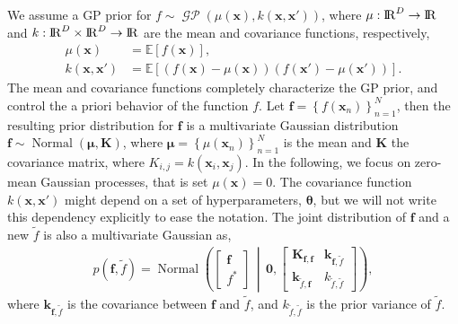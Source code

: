 \documentclass[onecolumn,a4paper,11pt]{article}
\DeclareMathOperator{\GP}{\mathcal{GP}}
\DeclareMathOperator{\Normal}{Normal}
\begin{document}
We assume a GP prior for $f \sim \GP(\mu(\bm{x}), k(\bm{x}, \bm{x}'))$, where $\mu: {\rm I\!R}^D \to {\rm I\!R}$ and $k: {\rm I\!R}^D \times {\rm I\!R}^D \to {\rm I\!R}$ are the mean and covariance functions, respectively,
%
\begin{align*}
 	\mu(\bm{x}) &= \mathbb{E}\!\left[f(\bm{x})\right],\\ 
 	k(\bm{x}, \bm{x}') &= \mathbb{E}\!\left[\left( f(\bm{x}) - \mu(\bm{x}) \right)\left( f(\bm{x}') - \mu(\bm{x}') \right)\right].
\end{align*} 
%
The mean and covariance functions completely characterize the GP prior, and control the a priori behavior of the function $f$. Let $\bm{f}=\left\lbrace f(\bm{x}_n) \right\rbrace_{n=1}^N$, then the resulting prior distribution for $\bm{f}$ is a multivariate Gaussian distribution $\bm{f} \sim \Normal(\bm{\mu}, \bm{K})$, where $\bm{\mu} = \left\lbrace \mu(\bm{x}_n) \right\rbrace_{n=1}^N$ is the mean and $\bm{K}$ the covariance matrix, where $K_{i,j}=k(\bm{x}_i,\bm{x}_j)$. In the following, we focus on zero-mean Gaussian processes, that is set $\mu(\bm{x}) = 0$. The covariance function $k(\bm{x}, \bm{x}')$ might depend on a set of hyperparameters, $\bm{\theta}$, but we will not write this dependency explicitly to ease the notation. The joint distribution of $\bm{f}$ and a new $\tilde{f}$ is also a multivariate Gaussian as,
%
\begin{align*}
p(\bm{f}, \tilde{f})=\Normal \left( \left[ \begin{array}{cc}
\bm{f} \\ 
f^*
\end{array} \right] \,\middle|\, \bm{0},\left[ \begin{array}{cc}
\bm{K}_{\bm{f},\bm{f}} & \bm{k}_{\bm{f},\tilde{f}} \\ 
\bm{k}_{\tilde{f},\bm{f}} & k_{\tilde{f},\tilde{f}}
\end{array} \right] \right),
\end{align*}
%
where $\bm{k}_{\bm{f},\tilde{f}}$ is the covariance between $\bm{f}$ and $\tilde{f}$, and $k_{\tilde{f},\tilde{f}}$ is the prior variance of $\tilde{f}$. %
\end{document}
